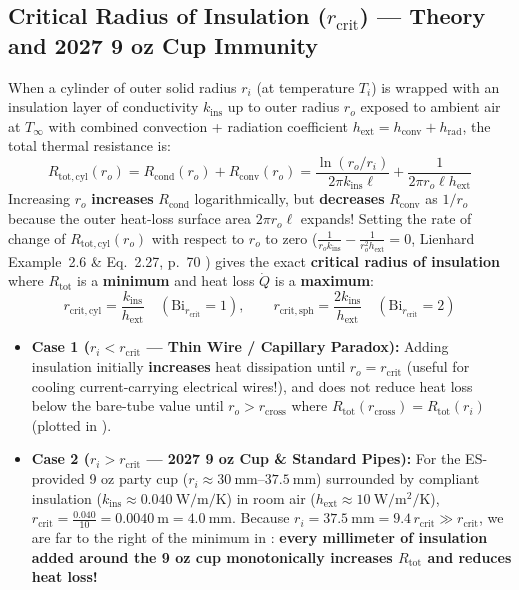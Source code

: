 \subsection{Critical Radius of Insulation ($r_{\mathrm{crit}}$) — Theory and 2027 9 oz Cup Immunity}
When a cylinder of outer solid radius $r_i$ (at temperature $T_i$) is wrapped with an insulation layer of conductivity $k_{\mathrm{ins}}$ up to outer radius $r_o$ exposed to ambient air at $T_\infty$ with combined convection + radiation coefficient $h_{\mathrm{ext}} = h_{\mathrm{conv}} + h_{\mathrm{rad}}$, the total thermal resistance is:
\begin{equation}
  R_{\mathrm{tot,cyl}}(r_o) = R_{\mathrm{cond}}(r_o) + R_{\mathrm{conv}}(r_o) = \frac{\ln(r_o / r_i)}{2\pi k_{\mathrm{ins}} \ell} + \frac{1}{2\pi r_o \ell h_{\mathrm{ext}}}
  \label{eq:10:rcrit-sum}
\end{equation}
Increasing $r_o$ \textbf{increases} $R_{\mathrm{cond}}$ logarithmically, but \textbf{decreases} $R_{\mathrm{conv}}$ as $1/r_o$ because the outer heat-loss surface area $2\pi r_o \ell$ expands! Setting the rate of change of $R_{\mathrm{tot,cyl}}(r_o)$ with respect to $r_o$ to zero ($\frac{1}{r_o k_{\mathrm{ins}}} - \frac{1}{r_o^2 h_{\mathrm{ext}}} = 0$, Lienhard Example~2.6 \& Eq.~2.27, p.~70 ) gives the exact \textbf{critical radius of insulation} where $R_{\mathrm{tot}}$ is a \textbf{minimum} and heat loss $\dot{Q}$ is a \textbf{maximum}:
\begin{equation}
  \boxed{r_{\mathrm{crit,cyl}} = \frac{k_{\mathrm{ins}}}{h_{\mathrm{ext}}} \quad (\mathrm{Bi}_{r_{\mathrm{crit}}} = 1), \qquad r_{\mathrm{crit,sph}} = \frac{2k_{\mathrm{ins}}}{h_{\mathrm{ext}}} \quad (\mathrm{Bi}_{r_{\mathrm{crit}}} = 2)}
  \label{eq:10:rcrit-boxed}
\end{equation}
\begin{itemize}
  \item \textbf{Case 1 ($r_i < r_{\mathrm{crit}}$ — Thin Wire / Capillary Paradox):} Adding insulation initially \textbf{increases} heat dissipation until $r_o = r_{\mathrm{crit}}$ (useful for cooling current-carrying electrical wires!), and does not reduce heat loss below the bare-tube value until $r_o > r_{\mathrm{cross}}$ where $R_{\mathrm{tot}}(r_{\mathrm{cross}}) = R_{\mathrm{tot}}(r_i)$ (plotted in ).
  \item \textbf{Case 2 ($r_i > r_{\mathrm{crit}}$ — 2027 9 oz Cup \& Standard Pipes):} For the ES-provided 9 oz party cup ($r_i \approx \SIrange{30}{37.5}{\milli\meter}$) surrounded by compliant insulation ($k_{\mathrm{ins}} \approx \SI{0.040}{\watt\per\meter\per\kelvin}$) in room air ($h_{\mathrm{ext}} \approx \SI{10}{\watt\per\square\meter\per\kelvin}$), $r_{\mathrm{crit}} = \frac{0.040}{10} = \SI{0.0040}{\meter} = \SI{4.0}{\milli\meter}$. Because $r_i = \SI{37.5}{\milli\meter} = 9.4\,r_{\mathrm{crit}} \gg r_{\mathrm{crit}}$, we are far to the right of the minimum in : \textbf{every millimeter of insulation added around the 9 oz cup monotonically increases $R_{\mathrm{tot}}$ and reduces heat loss!}
\end{itemize}

